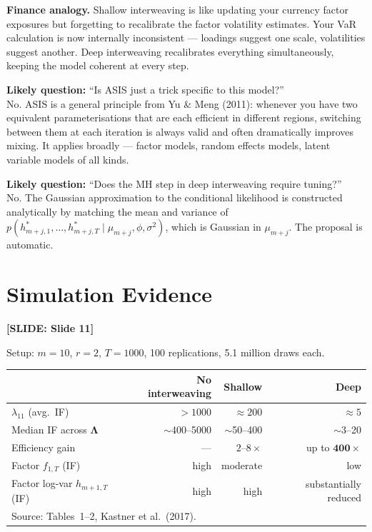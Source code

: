 \documentclass[11pt, a4paper]{article}\usepackage[]{graphicx}\usepackage[]{xcolor}
\newcommand{\slidetag}[1]{%
  \noindent\textcolor{MainBlue}{\footnotesize\textbf{[SLIDE: #1]}}%
  \vspace{0.2em}\par
}
\begin{document}
\textbf{Finance analogy.}  Shallow interweaving is like updating your
currency factor exposures but forgetting to recalibrate the factor volatility
estimates.  Your VaR calculation is now internally inconsistent --- loadings
suggest one scale, volatilities suggest another.  Deep interweaving
recalibrates everything simultaneously, keeping the model coherent at every
step.

\begin{remarkbox}
  \textbf{Likely question:} ``Is ASIS just a trick specific to this model?''\\
  No.  ASIS is a general principle from Yu \& Meng (2011): whenever you have
  two equivalent parameterisations that are each efficient in different
  regions, switching between them at each iteration is always valid and often
  dramatically improves mixing.  It applies broadly --- factor models, random
  effects models, latent variable models of all kinds.
\end{remarkbox}

\begin{remarkbox}
  \textbf{Likely question:} ``Does the MH step in deep interweaving require
  tuning?''\\
  No.  The Gaussian approximation to the conditional likelihood is constructed
  analytically by matching the mean and variance of
  $p(h^*_{m+j,1}, \ldots, h^*_{m+j,T} \mid \mu_{m+j}, \phi, \sigma^2)$,
  which is Gaussian in $\mu_{m+j}$.  The proposal is automatic.
\end{remarkbox}

\section{Simulation Evidence}

\slidetag{Slide 11}

Setup: $m = 10$, $r = 2$, $T = 1000$, 100 replications, 5.1 million draws
each.

\begin{center}
\begin{tabular}{lrrr}
  \toprule
  & \textbf{No interweaving} & \textbf{Shallow} & \textbf{Deep} \\
  \midrule
  $\lambda_{11}$ (avg.\ IF) & $>1000$ & $\approx 200$ & $\approx 5$ \\
  Median IF across $\boldsymbol{\Lambda}$ & $\sim$400--5000 & $\sim$50--400 & $\sim$3--20 \\
  Efficiency gain & --- & $2$--$8\times$ & up to $\mathbf{400\times}$ \\
  Factor $f_{1,T}$ (IF) & high & moderate & low \\
  Factor log-var $h_{m+1,T}$ (IF) & high & high & substantially reduced \\
  \bottomrule
  \multicolumn{4}{l}{\footnotesize Source: Tables~1--2, Kastner et al.\ (2017).}
\end{tabular}
\end{center}
\end{document}
